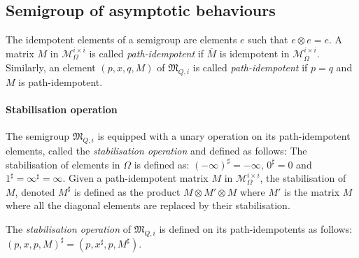 \documentclass{lmcs}
\theoremstyle{remark}
\newcommand{\matricesOm}[2]{\mathcal{M}^{#1 \times #2}_\Omega}
\newcommand{\ideal}{\mathfrak{M}}
\newcommand{\matricesOmbar}[2]{\mathcal{M}_{\overline{\Omega}}^{#1\times #2}}
\theoremstyle{remark}
\begin{document}
\subsection{Semigroup of asymptotic behaviours}

The idempotent elements of a semigroup are elements $e$ such that $e\otimes e=e$. A matrix $M$ in $\matricesOm{i}{i}$ is called \emph{path-idempotent} if $\overline{M}$ is idempotent in $\matricesOmbar{i}{i}$. Similarly, an element $(p,x,q,M)$ of $\ideal_{Q,i}$ is called \emph{path-idempotent} if $p=q$ and $M$ is path-idempotent.

\paragraph*{Stabilisation operation}
The semigroup $\ideal_{Q,i}$ is equipped with a unary operation on its path-idempotent elements, called the \emph{stabilisation operation} and defined as follows: The stabilisation of elements in $\Omega$ is defined as: $(-\infty)^\sharp = -\infty$, $0^\sharp = 0$ and $1^\sharp = \infty^\sharp = \infty$. 
Given a path-idempotent matrix $M$ in $\matricesOm{i}{i}$, the stabilisation of $M$, denoted $M^\sharp$ is defined as the product $M\otimes M' \otimes M$ where $M'$ is the matrix $M$ where all the diagonal elements are replaced by their stabilisation.

\begin{defi}\label{def:op:stab}
The \emph{stabilisation operation} of $\ideal_{Q,i}$ is defined on its path-idempotents as follows: $(p,x,p,M)^\sharp = (p,x^\sharp,p,M^\sharp)$.
\end{defi}
\end{document}
